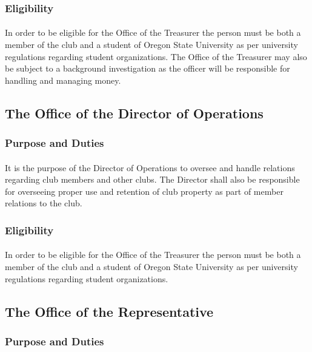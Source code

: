 \documentclass[12pt]{article}
\begin{document}
\subsubsection{Eligibility}
\paragraph{}
In order to be eligible for the Office of the Treasurer the person must be both a member of the club and a student of Oregon State University as per university regulations regarding student organizations.
The Office of the Treasurer may also be subject to a background investigation as the officer will be responsible for handling and managing money.

\subsection{The Office of the Director of Operations}
\subsubsection{Purpose and Duties}
\paragraph{}
It is the purpose of the Director of Operations to oversee and handle relations regarding club members and other clubs. The Director shall also be responsible for overseeing proper use and retention of club property as 
part of member relations to the club. 
\subsubsection{Eligibility}
\paragraph{}
In order to be eligible for the Office of the Treasurer the person must be both a member of the club and a student of Oregon State University as per university regulations regarding student organizations.

\subsection{The Office of the Representative}
\subsubsection{Purpose and Duties}
\end{document}
